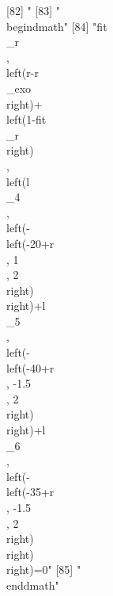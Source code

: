 [82] "%
[83] "\\begin{dmath}"                                                                                                                                                                                                                                                                                
[84] "{{fit\\_r}}\\, \\left({r}-{{r\\_exo}}\\right)+\\left(1-{{fit\\_r}}\\right)\\, \\left({{l\\_4}}\\, \\left(-\\left(-20+{r}\\, 1\\, 2\\right)\\right)+{{l\\_5}}\\, \\left(-\\left(-40+{r}\\, -1.5\\, 2\\right)\\right)+{{l\\_6}}\\, \\left(-\\left(-35+{r}\\, -1.5\\, 2\\right)\\right)\\right)=0"
[85] "\\end{dmath}"                                                                                                                                                                                                                                                                                  
